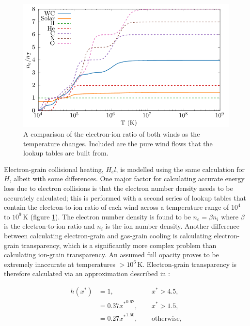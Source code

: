 \documentclass[fleqn,usenatbib]{mnras}
\begin{document}
\begin{figure}
  \centering
  \includegraphics[width=\linewidth]{assets/ionisation-fraction/ionisation-fraction.pdf}
  \caption[OB and WR electron-ion ratios]{A comparison of the electron-ion ratio of both winds as the temperature changes. Included are the pure wind flows that the lookup tables are built from.}
  \label{fig:electron-curve}
\end{figure}

Electron-grain collisional heating, $H_el$, is modelled using the same calculation for $H$, albeit with some differences.
One major factor for calculating accurate energy loss due to electron collisions is that the electron number density needs to be accurately calculated; this is performed with a second series of lookup tables that contain the electron-to-ion ratio of each wind across a temperature range of $10^4$ to $10^9\,\si{\kelvin}$ (figure \ref{fig:electron-curve}).
The electron number density is found to be $n_e = \beta n_i$ where $\beta$ is the electron-to-ion ratio and $n_i$ is the ion number density.
Another difference between calculating electron-grain and gas-grain cooling is calculating electron-grain transparency, which is a significantly more complex problem than calculating ion-grain transparency.
An assumed full opacity proves to be extremely inaccurate at temperatures $>10^6\,\si{\kelvin}$.
Electron-grain transparency is therefore calculated via an approximation described in \cite{dwek_infrared_1981}:

\begin{equation}
  \begin{alignedat}{3}
    h(x^*) & = 1 ,                && ~~ x^* > 4.5, \\
           & = 0.37{x^*}^{0.62} , && ~~ x^* > 1.5 , \\
           & = 0.27{x^*}^{1.50} , && ~~ \text{otherwise,}
  \end{alignedat}
\end{equation}
\end{document}
